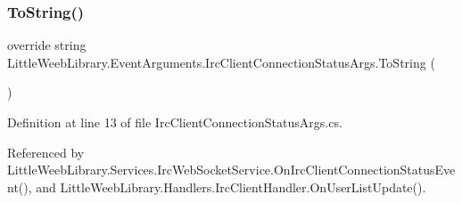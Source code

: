 \subsubsection{\texorpdfstring{To\+String()}{ToString()}}
{\footnotesize\ttfamily override string Little\+Weeb\+Library.\+Event\+Arguments.\+Irc\+Client\+Connection\+Status\+Args.\+To\+String (\begin{DoxyParamCaption}{ }\end{DoxyParamCaption})}



Definition at line 13 of file Irc\+Client\+Connection\+Status\+Args.\+cs.



Referenced by Little\+Weeb\+Library.\+Services.\+Irc\+Web\+Socket\+Service.\+On\+Irc\+Client\+Connection\+Status\+Event(), and Little\+Weeb\+Library.\+Handlers.\+Irc\+Client\+Handler.\+On\+User\+List\+Update().


